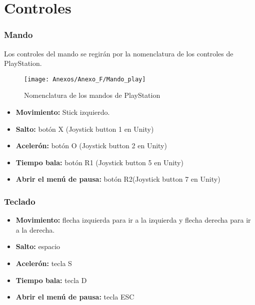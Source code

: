 \clearpage
\section{Controles}
\subsubsection{Mando}
Los controles del mando se regirán por la nomenclatura de los controles de PlayStation.

\begin{figure}[h]
\centering
\texttt{[image: Anexos/Anexo\_F/Mando\_play]}
\caption{Nomenclatura de los mandos de PlayStation}
\end{figure}

\begin{itemize}
\item
\textbf{Movimiento:} Stick izquierdo.
\item
\textbf{Salto:} botón X (Joystick button 1 en Unity)
\item
\textbf{Acelerón:} botón O (Joystick button 2 en Unity)
\item
\textbf{Tiempo bala:} botón R1 (Joystick button 5 en Unity)
\item
\textbf{Abrir el menú de pausa:} botón R2(Joystick button 7 en Unity)
\end{itemize}

\subsubsection{Teclado}
\begin{itemize}
\item
\textbf{Movimiento:} flecha izquierda para ir a la izquierda y flecha derecha para ir a la derecha.
\item
\textbf{Salto:} espacio 
\item
\textbf{Acelerón:} tecla S
\item
\textbf{Tiempo bala:} tecla D
\item
\textbf{Abrir el menú de pausa:} tecla ESC
\end{itemize}

